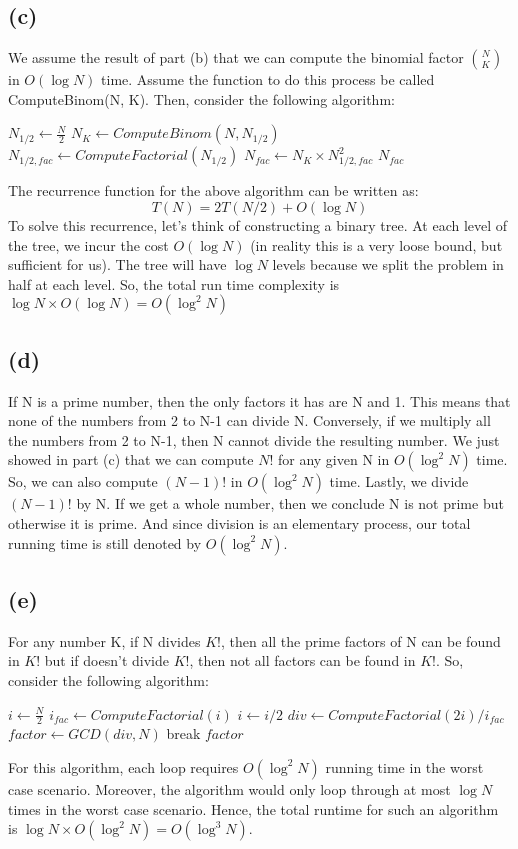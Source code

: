 \documentclass[a4paper,12pt]{article} %
\begin{document}
\subsection*{(c)}
We assume the result of part (b) that we can compute the binomial factor $\binom{N}{K}$ in $O(\log N)$ time. Assume the function to do this process be called ComputeBinom(N, K). Then, consider the following algorithm:
\begin{algorithmic}
        \State $N_{1/2} \gets \frac{N}{2}$
        \State $N_K \gets ComputeBinom(N, N_{1/2})$
        \State $N_{1/2, fac} \gets ComputeFactorial(N_{1/2})$
        \State $N_{fac} \gets N_K \times N_{1/2, fac}^2$
        \State \Return $N_{fac}$
    \EndFunction
\end{algorithmic}
The recurrence function for the above algorithm can be written as:
\[T(N) = 2T(N/2) + O(\log N)\]
To solve this recurrence, let's think of constructing a binary tree. At each level of the tree, we incur the cost $O(\log N)$ (in reality this is a very loose bound, but sufficient for us). The tree will have $\log N$ levels because we split the problem in half at each level. So, the total run time complexity is $\log N \times O(\log N) = O(\log^2 N)$ 

\subsection*{(d)}
If N is a prime number, then the only factors it has are N and 1. This means that none of the numbers from 2 to N-1 can divide N. Conversely, if we multiply all the numbers from 2 to N-1, then N cannot divide the resulting number. We just showed in part (c) that we can compute $N!$ for any given N in $O(\log^2 N)$ time. So, we can also compute $(N-1)!$ in $O(\log^2 N)$ time. Lastly, we divide $(N-1)!$ by N. If we get a whole number, then we conclude N is not prime but otherwise it is prime. And since division is an elementary process, our total running time is still denoted by $O(\log^2 N)$.

\subsection*{(e)}
For any number K, if N divides $K!$, then all the prime factors of N can be found in $K!$ but if doesn't divide $K!$, then not all factors can be found in $K!$. So, consider the following algorithm:
\begin{algorithmic}
        \State $i \gets \frac{N}{2}$
            \State $i_{fac} \gets ComputeFactorial(i)$
                \State $i \gets i/2$
            \Else
                \State $div \gets ComputeFactorial(2i)/i_{fac}$
                \State $factor \gets GCD(div, N)$
                \State break
            \EndIf
        \EndWhile
        \State \Return $factor$
    \EndFunction
\end{algorithmic}
For this algorithm, each loop requires $O(\log^2 N)$ running time in the worst case scenario. Moreover, the algorithm would only loop through at most $\log N$ times in the worst case scenario. Hence, the total runtime for such an algorithm is $\log N \times O(\log^2 N) = O(\log^3 N)$.
\end{document}
